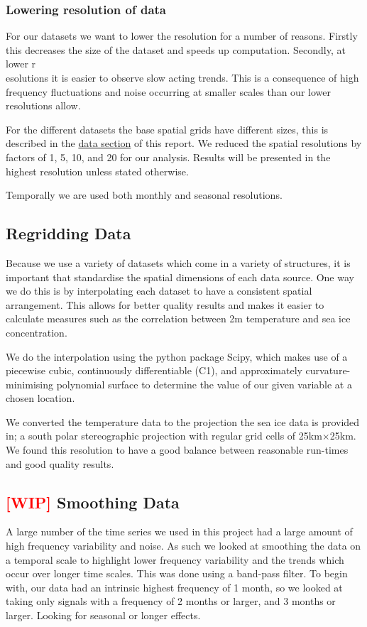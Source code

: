 \documentclass[../main.tex]{subfiles}
\begin{document}
\subsubsection*{Lowering resolution of data}
For our datasets we want to lower the resolution for a number of reasons. Firstly this decreases the size of the dataset and speeds up computation. Secondly, at lower r\\esolutions it is easier to observe slow acting trends. This is a consequence of high frequency fluctuations and noise occurring at smaller scales than our lower resolutions allow.

For the different datasets the base spatial grids have different sizes, this is described in the \hyperref[chap:data]{data section} of this report. We reduced the spatial resolutions by factors of 1, 5, 10, and 20 for our analysis. Results will be presented in the highest resolution unless stated otherwise.

Temporally we are used both monthly and seasonal resolutions.


\subsection{Regridding Data}
Because we use a variety of datasets which come in a variety of structures, it is important that standardise the spatial dimensions of each data source. One way we do this is by interpolating each dataset to have a consistent spatial arrangement. This allows for better quality results and makes it easier to calculate measures such as the correlation between 2m temperature and sea ice concentration.

We do the interpolation using the python package Scipy, which makes use of a piecewise cubic, continuously differentiable (C1), and approximately curvature-minimising polynomial surface to determine the value of our given variable at a chosen location. 

We converted the temperature data to the projection the sea ice data is provided in; a south polar stereographic projection with regular grid cells of 25km$\times$25km. We found this resolution to have a good balance between reasonable run-times and good quality results.

\subsection{\textcolor{red}{[WIP]} Smoothing Data}
A large number of the time series we used in this project had a large amount of high frequency variability and noise. As such we looked at smoothing the data on a temporal scale to highlight lower frequency variability and the trends which occur over longer time scales. This was done using a band-pass filter. To begin with, our data had an intrinsic highest frequency of 1 month, so we looked at taking only signals with a frequency of 2 months or larger, and 3 months or larger. Looking for seasonal or longer effects.
\end{document}
